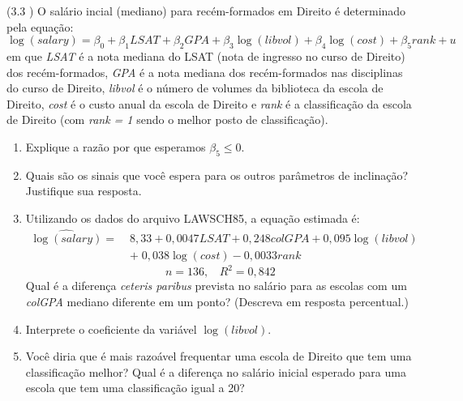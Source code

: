 \documentclass[12pt,letterpaper, onecolumn]{exam}
\begin{document}
\begin{questions}
\question (3.3 \citep{wooldridge2010}) O salário incial (mediano) para recém-formados em Direito é determinado pela equação:\begin{equation*}
    \log(salary) = \beta_0 + \beta_1LSAT + \beta_2GPA + \beta_3\log(libvol) + \beta_4\log(cost) + \beta_5rank + u
\end{equation*} em que \textit{LSAT} é a nota mediana do LSAT (nota de ingresso no curso de Direito) dos recém-formados, \textit{GPA} é a nota mediana dos recém-formados nas disciplinas do curso de Direito, \textit{libvol} é o número de volumes da biblioteca da escola de Direito, \textit{cost} é o custo anual da escola de Direito e \textit{rank} é a classificação da escola de Direito (com \textit{rank = 1} sendo o melhor posto de classificação).
\begin{enumerate}[label=(\alph*)]
    \item Explique a razão por que esperamos $\beta_5 \leq 0$.
    \item Quais são os sinais que você espera para os outros parâmetros de inclinação? Justifique sua resposta.
    \item Utilizando os dados do arquivo LAWSCH85, a equação estimada é:
    \begin{equation*}\begin{aligned}
        \widehat{\log(salary)} =\; & 8,33 + 0,0047LSAT + 0,248colGPA +0,095\log(libvol)\\ & + \; 0,038\log(cost) -0,0033rank
        \end{aligned}
    \end{equation*} \begin{equation*}
        n = 136, \ \ \ \ R^2 = 0,842
    \end{equation*} Qual é a diferença \textit{ceteris paribus} prevista no salário para as escolas com um \textit{colGPA} mediano diferente em um ponto? (Descreva em resposta percentual.)
    \item Interprete o coeficiente da variável $\log(libvol)$.
    \item Você diria que é mais razoável frequentar uma escola de Direito que tem uma classificação melhor? Qual é a diferença no salário inicial esperado para uma escola que tem uma classificação igual a 20?
\end{enumerate}

\
\



\end{questions}
\end{document}
